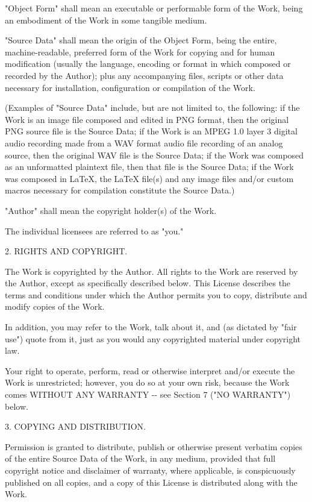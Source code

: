 \documentclass[
  english,
  11pt,
  a4paper,
]{article}
\begin{document}
"Object Form" shall mean an executable or performable form of the Work,
being an embodiment of the Work in some tangible medium.

"Source Data" shall mean the origin of the Object Form, being the
entire, machine-readable, preferred form of the Work for copying and for
human modification (usually the language, encoding or format in which
composed or recorded by the Author); plus any accompanying files,
scripts or other data necessary for installation, configuration or
compilation of the Work.

(Examples of "Source Data" include, but are not limited to, the
following: if the Work is an image file composed and edited in PNG
format, then the original PNG source file is the Source Data; if the
Work is an MPEG 1.0 layer 3 digital audio recording made from a WAV
format audio file recording of an analog source, then the original WAV
file is the Source Data; if the Work was composed as an unformatted
plaintext file, then that file is the Source Data; if the Work was
composed in LaTeX, the LaTeX file(s) and any image files and/or custom
macros necessary for compilation constitute the Source Data.)

"Author" shall mean the copyright holder(s) of the Work.

The individual licensees are referred to as "you."

2. RIGHTS AND COPYRIGHT.

The Work is copyrighted by the Author. All rights to the Work are
reserved by the Author, except as specifically described below. This
License describes the terms and conditions under which the Author
permits you to copy, distribute and modify copies of the Work.

In addition, you may refer to the Work, talk about it, and (as dictated
by "fair use") quote from it, just as you would any copyrighted material
under copyright law.

Your right to operate, perform, read or otherwise interpret and/or
execute the Work is unrestricted; however, you do so at your own risk,
because the Work comes WITHOUT ANY WARRANTY -\/- see Section 7 ("NO
WARRANTY") below.

3. COPYING AND DISTRIBUTION.

Permission is granted to distribute, publish or otherwise present
verbatim copies of the entire Source Data of the Work, in any medium,
provided that full copyright notice and disclaimer of warranty, where
applicable, is conspicuously published on all copies, and a copy of this
License is distributed along with the Work.
\end{document}
